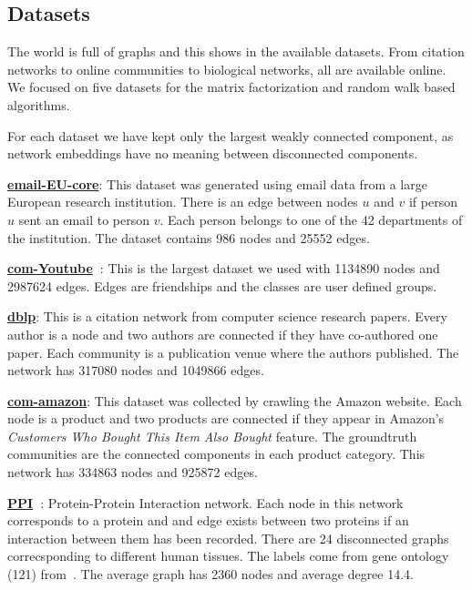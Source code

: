 \subsection{Datasets}

The world is full of graphs and this shows in the available datasets. From citation networks to
online communities to biological networks, all are available online.  We focused on five datasets
for the matrix factorization and random walk based algorithms.

For each dataset we have kept only the largest weakly connected component, as network embeddings
have no meaning between disconnected components.

{\bf \href{https://snap.stanford.edu/data/email-Eu-core.html}{email-EU-core}}: This dataset was
generated using email data from a large European research institution. There is an edge between
nodes $u$ and $v$ if person $u$ sent an email to person $v$.  Each person belongs to one of the 42
departments of the institution. The dataset contains 986 nodes and 25552 edges.

{\bf \href{https://snap.stanford.edu/data/com-Youtube.html}{com-Youtube}~\cite{mislove-2007-socialnetworks}}:
This is the largest dataset we used with 1134890 nodes and 2987624 edges. Edges are friendships and
the classes are user defined groups.

{\bf \href{https://snap.stanford.edu/data/com-DBLP.html}{dblp}}: This is a citation network from
computer science research papers. Every author is a node and two authors are connected if they have
co-authored one paper. Each community is a publication venue where the authors published. The
network has 317080 nodes and 1049866 edges.

{\bf \href{https://snap.stanford.edu/data/com-Amazon.html}{com-amazon}}: This dataset was collected
by crawling the Amazon website. Each node is a product and two products are connected if they appear
in Amazon's {\it Customers Who Bought This Item Also Bought} feature. The groundtruth communities
are the connected components in each product category.  This network has 334863 nodes and 925872
edges.

{\bf \href{http://snap.stanford.edu/graphsage/}{PPI}~\cite{hamilton2017inductive}}: Protein-Protein
Interaction network. Each node in this network corresponds to a protein and and edge exists between
two proteins if an interaction between them has been recorded. There are 24 disconnected graphs
correcsponding to different human tissues.  The labels come from gene ontology (121)
from~\cite{subramanian2005gene}. The average graph has 2360 nodes and average degree 14.4.
